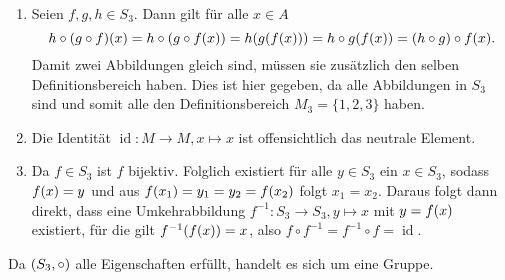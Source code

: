 \documentclass[german,12pt]{homework}
\DeclareMathOperator{\id}{id}
\DeclarePairedDelimiter{\enbrace}{(}{)}
\begin{document}
    \begin{enumerate}
        \item Seien \(f,g, h \in S_3\). Dann gilt für alle \(x \in A\)
        \[h \circ \enbrace*{g \circ f}\enbrace*{x} = h \circ \enbrace*{g \circ
        f\enbrace*{x}} = h\enbrace*{g\enbrace*{f\enbrace*{x}}} = h \circ
        g\enbrace*{f\enbrace*{x}} = \enbrace*{h \circ g} \circ f\enbrace*{x}.\]
        Damit zwei Abbildungen gleich sind, müssen sie zusätzlich den selben
        Definitionsbereich haben. Dies ist hier gegeben, da alle Abbildungen in
        \(S_3\) sind und somit alle den Definitionsbereich \(M_3 = \{1, 2,
        3\}\) haben.
        \item Die Identität \(\id: M \to M, x \mapsto x\) ist offensichtlich
        das neutrale Element.
        \item Da \(f \in S_3\) ist \(f\) bijektiv. Folglich existiert für alle
        \(y \in S_3\) ein \(x \in S_3\), sodass \(f\enbrace*{x} = y\) und aus
        \(f\enbrace*{x_1} = y_1 = y_2 = f\enbrace*{x_2}\) folgt \(x_1 = x_2\).
        Daraus folgt dann direkt, dass eine Umkehrabbildung \(f^{-1}: S_3 \to
        S_3, y \mapsto x\) mit \(y = f\enbrace*{x}\) existiert, für die gilt
        \(f^{-1}\enbrace*{f\enbrace*{x}} = x\), also \(f \circ f^{-1} = f^{-1}
        \circ f = \id\).
    \end{enumerate}
    Da \(\enbrace*{S_3, \circ}\) alle Eigenschaften erfüllt, handelt es sich um
    eine Gruppe.
\end{document}
